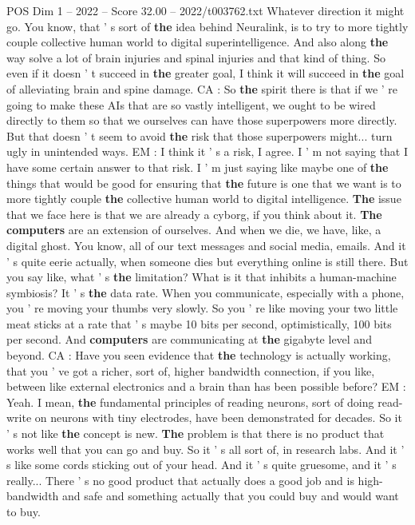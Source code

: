 \begin{textsample}{POS Dim 1 – 2022 – Score 32.00 – 2022/t003762.txt}
Whatever direction it might go.
You know, that ' s sort of \textbf{the} idea behind Neuralink, is to try to more tightly couple collective human world to digital superintelligence.
And also along \textbf{the} way solve a lot of brain injuries and spinal injuries and that kind of thing.
So even if it doesn ' t succeed in \textbf{the} greater goal, I think it will succeed in \textbf{the} goal of alleviating brain and spine damage.
CA : So \textbf{the} spirit there is that if we ' re going to make these AIs that are so vastly intelligent, we ought to be wired directly to them so that we ourselves can have those superpowers more directly.
But that doesn ' t seem to avoid \textbf{the} risk that those superpowers might... turn ugly in unintended ways.
EM : I think it ' s a risk, I agree.
I ' m not saying that I have some certain answer to that risk.
I ' m just saying like maybe one of \textbf{the} things that would be good for ensuring that \textbf{the} future is one that we want is to more tightly couple \textbf{the} collective human world to digital intelligence. \textbf{The} issue that we face here is that we are already a cyborg, if you think about it. \textbf{The} \textbf{computers} are an extension of ourselves.
And when we die, we have, like, a digital ghost.
You know, all of our text messages and social media, emails.
And it ' s quite eerie actually, when someone dies but everything online is still there.
But you say like, what ' s \textbf{the} limitation?
What is it that inhibits a human-machine symbiosis?
It ' s \textbf{the} data rate.
When you communicate, especially with a phone, you ' re moving your thumbs very slowly.
So you ' re like moving your two little meat sticks at a rate that ' s maybe 10 bits per second, optimistically, 100 bits per second.
And \textbf{computers} are communicating at \textbf{the} gigabyte level and beyond.
CA : Have you seen evidence that \textbf{the} technology is actually working, that you ' ve got a richer, sort of, higher bandwidth connection, if you like, between like external electronics and a brain than has been possible before?
EM : Yeah.
I mean, \textbf{the} fundamental principles of reading neurons, sort of doing read-write on neurons with tiny electrodes, have been demonstrated for decades.
So it ' s not like \textbf{the} concept is new. \textbf{The} problem is that there is no product that works well that you can go and buy.
So it ' s all sort of, in research labs.
And it ' s like some cords sticking out of your head.
And it ' s quite gruesome, and it ' s really...
There ' s no good product that actually does a good job and is high-bandwidth and safe and something actually that you could buy and would want to buy.

\end{textsample}
